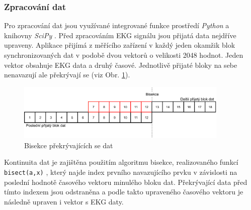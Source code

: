 \subsubsection{Zpracování dat}
\label{section:online_data_process}
Pro zpracování dat jsou využívané integrované funkce prostředí \textit{Python} a
knihovny \textit{SciPy} \cite{SciPy2020}. Před zpracováním EKG signálu jsou
přijatá data nejdříve upraveny. Aplikace přijímá z měřícího zařízení v každý
jeden okamžik blok synchronizovaných dat v podobě dvou vektorů o velikosti 2048
hodnot. Jeden vektor obsahuje EKG data a druhý časové. Jednotlivě přijaté bloky
na sebe nenavazují ale překrývají se (viz Obr. \ref{fig:bisection}).
\begin{figure}[h]
    \begin{center}
        \includegraphics[width=0.9\textwidth]{../assets/figures/bisection}
        \caption{Bisekce překrývajících se dat}
        \label{fig:bisection}
    \end{center}
\end{figure}
Kontinuita dat je zajištěna použitím algoritmu bisekce, realizovaného funkcí
\texttt{bisect(a,x)} \cite{bisectRight}, který najde index prvního navazujícího
prvku v závislosti na poslední hodnotě časového vektoru minulého bloku dat.
Překrývající data před tímto indexem jsou odstraněna a podle takto upraveného
časového vektoru je následně upraven i vektor s EKG daty.

